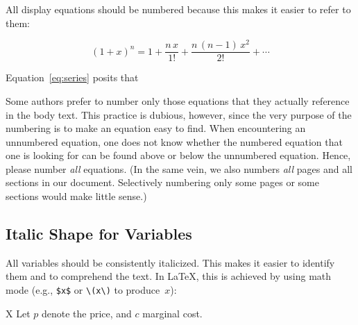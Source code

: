 All display equations should be numbered because this makes it easier to refer to them:
\begin{longtblr}{}
	\begin{minipage}{\linewidth}\noindent%
		\begin{equation}
			\label{eq:series}
			(1+x)^n = 1 + \frac{n\,x}{1!} + \frac{n\,(n-1)\,x^2}{2!} + \cdots
		\end{equation}\par
		Equation~\eqref{eq:series} posits that \textellipsis%
		\strut
	\end{minipage}
\end{longtblr}
\noindent Some authors prefer to number only those equations that they actually reference in the body text. This practice is dubious, however, since the very purpose of the numbering is to make an equation easy to find. When encountering an unnumbered equation, one does not know whether the numbered equation that one is looking for can be found above or below the unnumbered equation. Hence, please number \emph{all} equations. (In the same vein, we also numbers \emph{all} pages and all sections in our document. Selectively numbering only some pages or some sections would make little sense.)

\pagebreak

\subsection{Italic Shape for Variables}
All variables should be consistently italicized. This makes it easier to identify them and to com\-pre\-hend the text. In LaTeX, this is achieved by using math mode (e.g., \verb|$x$| or \verb|\(x\)| to produce~$x$):
\begin{longtblr}{X}
	Let $p$ denote the price, and $c$ marginal cost.
\end{longtblr}

